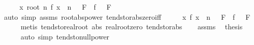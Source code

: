 \begin{isabellebody}
%
\isadelimproof
%
\endisadelimproof
%
\isatagproof
{}\isamarkupfalse%
\ {\isacharminus}{\kern0pt}\isanewline
\ \ \isamarkupfalse%
\ {\isachardoublequoteopen}{\isacharparenleft}{\kern0pt}{\isacharparenleft}{\kern0pt}{\isasymlambda}x{\isachardot}{\kern0pt}\ {\isasymbar}root\ n\ {\isacharparenleft}{\kern0pt}f\ x\ {\isacharcircum}{\kern0pt}\ n{\isacharparenright}{\kern0pt}{\isasymbar}{\isacharparenright}{\kern0pt}\ {\isasymlonglongrightarrow}\ {}{\isacharparenright}{\kern0pt}\ F\ {\isasymLongrightarrow}\ {\isacharparenleft}{\kern0pt}f\ {\isasymlonglongrightarrow}\ {}{\isacharparenright}{\kern0pt}\ F{\isachardoublequoteclose}\isanewline
\ \ \ \ \isamarkupfalse%
\ {\isacharparenleft}{\kern0pt}auto\ simp{\isacharcolon}{\kern0pt}\ assms\ root{\isacharunderscore}{\kern0pt}abs{\isacharunderscore}{\kern0pt}power\ tendsto{\isacharunderscore}{\kern0pt}rabs{\isacharunderscore}{\kern0pt}zero{\isacharunderscore}{\kern0pt}iff{\isacharparenright}{\kern0pt}\isanewline
\ \ \isamarkupfalse%
\ \isamarkupfalse%
\ {\isachardoublequoteopen}{\isacharparenleft}{\kern0pt}{\isacharparenleft}{\kern0pt}{\isasymlambda}x{\isachardot}{\kern0pt}\ f\ x\ {\isacharcircum}{\kern0pt}\ n{\isacharparenright}{\kern0pt}\ {\isasymlonglongrightarrow}\ {}{\isacharparenright}{\kern0pt}\ F\ {\isasymLongrightarrow}\ {\isacharparenleft}{\kern0pt}f\ {\isasymlonglongrightarrow}\ {}{\isacharparenright}{\kern0pt}\ F{\isachardoublequoteclose}\isanewline
\ \ \ \ \isamarkupfalse%
\ {\isacharparenleft}{\kern0pt}metis\ tendsto{\isacharunderscore}{\kern0pt}real{\isacharunderscore}{\kern0pt}root\ abs{\isacharunderscore}{\kern0pt}{}\ real{\isacharunderscore}{\kern0pt}root{\isacharunderscore}{\kern0pt}zero\ tendsto{\isacharunderscore}{\kern0pt}rabs{\isacharparenright}{\kern0pt}\isanewline
\ \ \isamarkupfalse%
\ assms\ \isamarkupfalse%
\ {\isacharquery}{\kern0pt}thesis\isanewline
\ \ \ \ \isamarkupfalse%
\ {\isacharparenleft}{\kern0pt}auto\ simp{\isacharcolon}{\kern0pt}\ tendsto{\isacharunderscore}{\kern0pt}null{\isacharunderscore}{\kern0pt}power{\isacharparenright}{\kern0pt}\isanewline
{}\isamarkupfalse%
%
\endisatagproof
{\isafoldproof}%
%
\isadelimproof
%
\endisadelimproof
%
\isadelimdocument
%
\endisadelimdocument
%
\isatagdocument
%
\isamarkuptrue%
%
\endisatagdocument
{\isafolddocument}%
%
\isadelimdocument
%
\endisadelimdocument
{}\isamarkupfalse%

\end{isabellebody}
